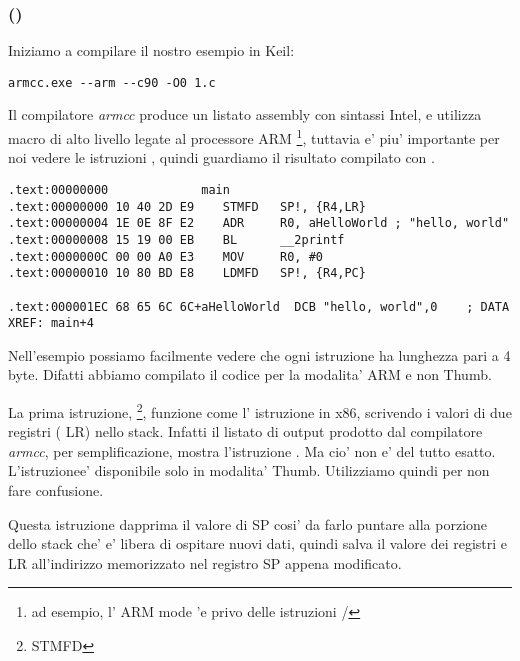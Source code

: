 \subsubsection{\NonOptimizingKeilVI (\ARMMode)}

Iniziamo a compilare il nostro esempio in Keil:

\begin{lstlisting}
armcc.exe --arm --c90 -O0 1.c 
\end{lstlisting}

\myindex{\IntelSyntax}
Il compilatore \emph{armcc} produce un listato assembly con sintassi Intel,
e utilizza macro di alto livello legate al processore ARM
\footnote{ad esempio, l' ARM mode 'e privo delle istruzioni \PUSH/\POP},
tuttavia e' piu' importante per noi vedere le istruzioni , quindi guardiamo il risultato compilato con \IDA.

\begin{lstlisting}[caption=\NonOptimizingKeilVI (\ARMMode) \IDA,style=customasmARM]
.text:00000000             main
.text:00000000 10 40 2D E9    STMFD   SP!, {R4,LR}
.text:00000004 1E 0E 8F E2    ADR     R0, aHelloWorld ; "hello, world"
.text:00000008 15 19 00 EB    BL      __2printf
.text:0000000C 00 00 A0 E3    MOV     R0, #0
.text:00000010 10 80 BD E8    LDMFD   SP!, {R4,PC}

.text:000001EC 68 65 6C 6C+aHelloWorld  DCB "hello, world",0    ; DATA XREF: main+4
\end{lstlisting}

Nell'esempio possiamo facilmente vedere che ogni istruzione ha lunghezza pari a 4 byte.
Difatti abbiamo compilato il codice per la modalita' ARM e non Thumb.

La prima istruzione, \footnote{\ac{STMFD}},
funzione come l' istruzione \PUSH in x86, scrivendo i valori di due registri ( \ITAph{} \ac{LR}) nello stack.
Infatti il listato di output prodotto dal compilatore \emph{armcc}, per semplificazione, mostra l'istruzione .
Ma cio' non e' del tutto esatto. L'istruzione\PUSH e' disponibile solo in modalita' Thumb. Utilizziamo quindi \IDA per non fare confusione.

Questa istruzione dapprima  il valore di \ac{SP} cosi' da farlo puntare alla porzione dello stack che' e' libera di ospitare nuovi dati, quindi salva il valore dei registri  e \ac{LR} all'indirizzo memorizzato nel registro \ac{SP} appena modificato.

